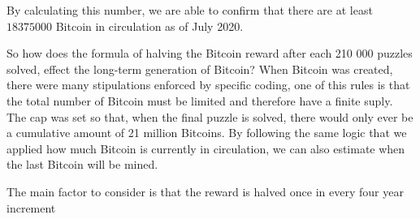 \documentclass{article}
\begin{document}
 By calculating this number, we are able to confirm that there are at least \(18 375 000\) Bitcoin in circulation as of July 2020.
 
 So how does the formula of halving the Bitcoin reward after each 210 000 puzzles solved, effect the long-term generation of Bitcoin?
 When Bitcoin was created, there were many stipulations enforced by specific coding, one of this rules is that the total number of Bitcoin must be limited and therefore have a finite suply. The cap was set so that, when the final puzzle is solved, there would only ever be a cumulative amount of 21 million Bitcoins. By following the same logic that we applied how much Bitcoin is currently in circulation, we can also estimate when the last Bitcoin will be mined.
 
 The main factor to consider is that the reward is halved once in every four year increment





\nocite{*}
\printbibliography
\end{document}
